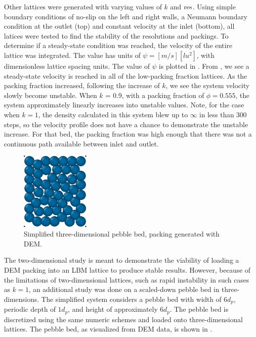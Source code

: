 Other lattices were generated with varying values of $k$ and $\text{res}$. Using simple boundary conditions of no-slip on the left and right walls, a Neumann boundary condition at the outlet (top) and constant velocity at the inlet (bottom), all latices were tested to find the stability of the resolutions and packings. To determine if a steady-state condition was reached, the velocity of the entire lattice was integrated. The value has units of $\psi = [m/s][lu^2]$, with dimensionless lattice spacing units. The value of $\psi$ is plotted in . From , we see a steady-state velocity is reached in all of the low-packing fraction lattices. As the packing fraction increased, following the increase of $k$, we see the system velocity slowly become unstable. When $k$ = 0.9, with a packing fraction of $\phi = 0.555$, the system approximately linearly increases into unstable values. Note, for the case when $k=1$, the density calculated in this system blew up to $\infty$ in less than 300 steps, so the velocity profile does not have a chance to demonstrate the unstable increase. For that bed, the packing fraction was high enough that there was not a continuous path available between inlet and outlet.

\begin{figure}[h]
    \centering
    \includegraphics[width=0.3\textwidth]{figures/lbm/3d-bed}
    \caption{Simplified three-dimensional pebble bed, packing generated with DEM.}\label{fig:3d-bed-lbm}
\end{figure}

The two-dimensional study is meant to demonstrate the viability of loading a DEM packing into an LBM lattice to produce stable results. However, because of the limitations of two-dimensional lattices, such as rapid instability in such cases as $k=1$, an additional study was done on a scaled-down pebble bed in three-dimensions. The simplified system considers a pebble bed with width of $6d_p$, periodic depth of $1d_p$, and height of approximately $6d_p$. The pebble bed is discretized using the same numeric schemes and loaded onto three-dimensional lattices. The pebble bed, as visualized from DEM data, is shown in . 

